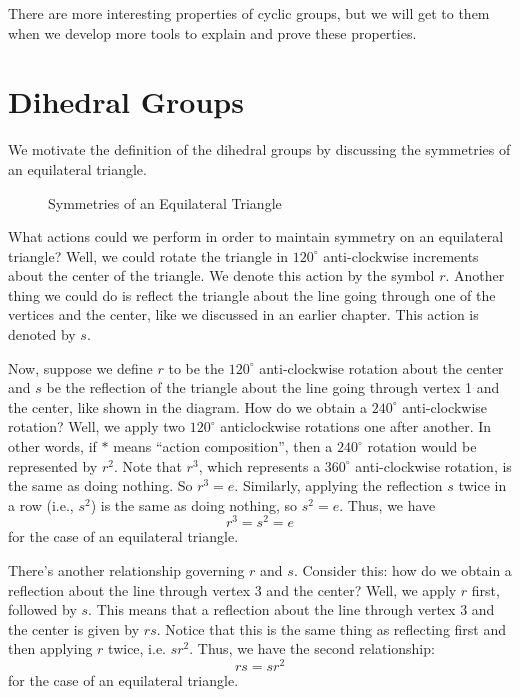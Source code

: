 There are more interesting properties of cyclic groups, but we will get to them when we develop more tools to explain and prove these properties.

\section{Dihedral Groups}
We motivate the definition of the dihedral groups by discussing the symmetries of an equilateral triangle.

\begin{figure}[h]
    \centering
    \caption{Symmetries of an Equilateral Triangle}
\end{figure}

What actions could we perform in order to maintain symmetry on an equilateral triangle? Well, we could rotate the triangle in $120^\circ$ anti-clockwise increments about the center of the triangle. We denote this action by the symbol $r$. Another thing we could do is reflect the triangle about the line going through one of the vertices and the center, like we discussed in an earlier chapter. This action is denoted by $s$.

Now, suppose we define $r$ to be the $120^\circ$ anti-clockwise rotation about the center and $s$ be the reflection of the triangle about the line going through vertex 1 and the center, like shown in the diagram. How do we obtain a $240^\circ$ anti-clockwise rotation? Well, we apply two $120^\circ$ anticlockwise rotations one after another. In other words, if $\ast$ means ``action composition'', then a $240^\circ$ rotation would be represented by $r^2$. Note that $r^3$, which represents a $360^\circ$ anti-clockwise rotation, is the same as doing nothing. So $r^3 = e$. Similarly, applying the reflection $s$ twice in a row (i.e., $s^2$) is the same as doing nothing, so $s^2 = e$. Thus, we have
\[
    r^3 = s^2 = e
\]
for the case of an equilateral triangle.

There's another relationship governing $r$ and $s$. Consider this: how do we obtain a reflection about the line through vertex 3 and the center? Well, we apply $r$ first, followed by $s$. This means that a reflection about the line through vertex 3 and the center is given by $rs$. Notice that this is the same thing as reflecting first and then applying $r$ twice, i.e. $sr^2$. Thus, we have the second relationship:
\[
    rs = sr^2
\]
for the case of an equilateral triangle.

